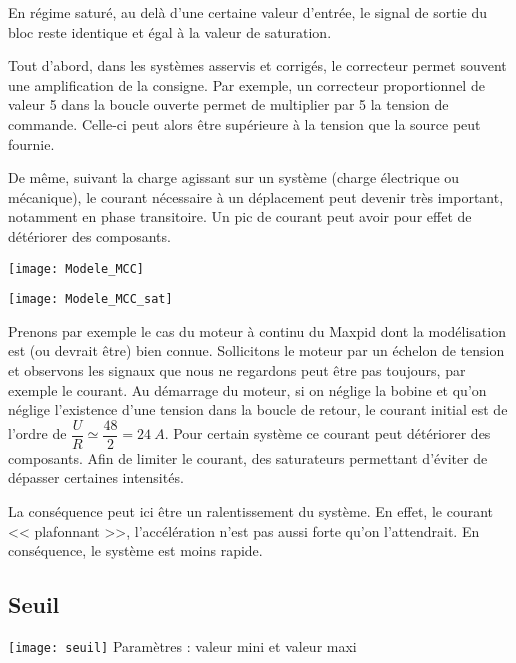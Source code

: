 En régime saturé, au delà d'une certaine valeur d'entrée, le signal de sortie du bloc reste identique et égal à la valeur de saturation.




Tout d'abord, dans les systèmes asservis et corrigés, le correcteur permet souvent une amplification de la consigne. Par exemple, un correcteur proportionnel de valeur 5 dans la boucle ouverte permet de multiplier par 5 la tension de commande. Celle-ci peut alors être supérieure à la tension que la source peut fournie.

De même, suivant la charge agissant sur un système (charge électrique ou mécanique), le courant nécessaire à un déplacement peut devenir très important, notamment en phase transitoire. Un pic de courant peut avoir pour effet de détériorer des composants.


\begin{marginfigure}
\texttt{[image: Modele\_MCC]}

\texttt{[image: Modele\_MCC\_sat]}
\end{marginfigure}
\begin{exemple}

Prenons par exemple le cas du moteur à continu du Maxpid dont la modélisation est (ou devrait être)  bien connue. Sollicitons le moteur par un échelon de tension et observons les signaux que nous ne regardons peut être pas toujours, par exemple le courant. 
Au démarrage du moteur, si on néglige la bobine et qu'on néglige l'existence d'une tension dans la boucle de retour, le courant initial est de l'ordre de $\dfrac{U}{R}\simeq \dfrac{48}{2}=\SI{24}{A}$. Pour certain système ce courant peut détériorer des composants. Afin de limiter le courant, des saturateurs permettant d'éviter de dépasser certaines intensités. 

La conséquence peut ici être un ralentissement du système. En effet, le courant << plafonnant >>, l'accélération n'est pas aussi forte qu'on l'attendrait. En conséquence, le système est moins rapide. 

\end{exemple}

\subsection{Seuil}

\begin{marginfigure}[-2cm]
\centering
\texttt{[image: seuil]}
Paramètres : valeur mini et valeur maxi
\end{marginfigure}

